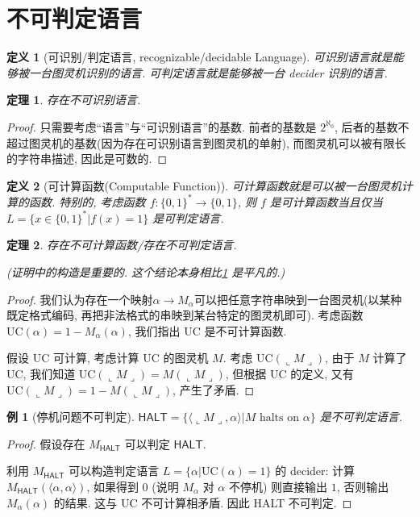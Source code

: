 \documentclass[8pt]{article}
\theoremstyle{compact}
\newtheorem{theorem}{定理}[section]
\newtheorem{definition}{定义}[section]
\newtheorem{example}{例}[section]
\def\rep#1{\llcorner{#1}\lrcorner}
\begin{document}
\section{不可判定语言}
\begin{definition}[可识别/判定语言, recognizable/decidable Language]
	可识别语言就是能够被一台图灵机识别的语言. 可判定语言就是能够被一台 decider 识别的语言.
\end{definition}
\begin{theorem}
	存在不可识别语言.
	\label{unrecognize_exists}
\end{theorem}
\begin{proof}
	只需要考虑“语言”与“可识别语言”的基数. 前者的基数是 $2^{\aleph_0}$, 后者的基数不超过图灵机的基数(因为存在可识别语言到图灵机的单射), 而图灵机可以被有限长的字符串描述, 因此是可数的.
\end{proof}
\begin{definition}[可计算函数(Computable Function)]
	可计算函数就是可以被一台图灵机计算的函数. 特别的, 考虑函数 $f: \{0, 1\}^* \to \{0, 1\}$, 则 $f$ 是可计算函数当且仅当 $L = \{x \in \{0, 1\}^*| f(x) = 1\}$ 是可判定语言.
\end{definition}
\begin{theorem}
	存在不可计算函数/存在不可判定语言. 
	
	(证明中的构造是重要的. 这个结论本身相比\cref{unrecognize_exists} 是平凡的.)
\end{theorem}
\begin{proof}
	我们认为存在一个映射$\alpha \to M_{\alpha}$可以把任意字符串映到一台图灵机(以某种既定格式编码, 再把非法格式的串映到某台特定的图灵机即可). 考虑函数 $\text{UC}(\alpha) = 1 - M_{\alpha}(\alpha)$, 我们指出 $\text{UC}$ 是不可计算函数.

	假设 $\text{UC}$ 可计算, 考虑计算 $\text{UC}$ 的图灵机 $M$. 考虑 $\text{UC}(\rep{M})$, 由于 $M$ 计算了 $\text{UC}$, 我们知道 $\text{UC}(\rep{M}) = M(\rep M)$, 但根据 $\text{UC}$ 的定义, 又有 $\text{UC}(\rep M) = 1 - M(\rep M)$, 产生了矛盾.
\end{proof}
\begin{example}[停机问题不可判定]
	$\textsf{HALT} = \{\langle \rep M, \alpha \rangle | M \text{ halts on } \alpha\}$ 是不可判定语言.
\end{example}
\begin{proof}
	假设存在 $M_{\textsf{HALT}}$ 可以判定 $\textsf{HALT}$.
	
	利用 $M_{\textsf{HALT}}$ 可以构造判定语言 $L = \{\alpha | \text{UC}(\alpha) = 1\}$ 的 decider: 计算 $M_{\textsf{HALT}}(\langle \alpha, \alpha \rangle)$, 如果得到 $0$ (说明 $M_{\alpha}$ 对 $\alpha$ 不停机) 则直接输出 $1$, 否则输出$M_{\alpha}(\alpha)$ 的结果. 这与 $\text{UC}$ 不可计算相矛盾. 因此 \textsf{HALT} 不可判定.
\end{proof}
\end{document}
